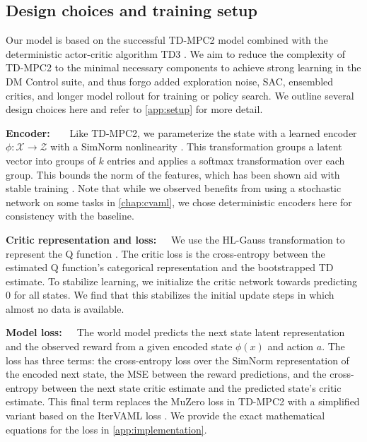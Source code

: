 \subsection{Design choices and training setup}
\label{sec:mad:method}

Our model is based on the successful TD-MPC2 model \parencite{hansen2024tdmpc} combined with the deterministic actor-critic algorithm TD3 \parencite{fujimoto2018addressing}.
We aim to reduce the complexity of TD-MPC2 to the minimal necessary components to achieve strong learning in the DM Control suite, and thus forgo added exploration noise, SAC, ensembled critics, and longer model rollout for training or policy search. We outline several design choices here and refer to \autoref{app:setup} for more detail.

\textbf{Encoder:}~~~~Like TD-MPC2, we parameterize the state with a learned encoder $\phi: \mathcal{X} \rightarrow \mathcal{Z}$ with a SimNorm nonlinearity \parencite{lavoie2023simplicial}. 
This transformation groups a latent vector into groups of $k$ entries and applies a softmax transformation over each group.
This bounds the norm of the features, which has been shown aid with stable training \parencite{hussing2024dissecting,nauman2024overestimation}.
Note that while we observed benefits from using a stochastic network on some tasks in \autoref{chap:cvaml}, we chose deterministic encoders here for consistency with the baseline.

\textbf{Critic representation and loss:}~~~We use the HL-Gauss transformation to represent the Q function \parencite{farebrother2024stop}. The critic loss is the cross-entropy between the estimated Q function's categorical representation and the bootstrapped TD estimate.
To stabilize learning, we initialize the critic network towards predicting $0$ for all states.
We find that this stabilizes the initial update steps in which almost no data is available.

\textbf{Model loss:}~~~The world model predicts the next state latent representation and the observed reward from a given encoded state $\phi(x)$ and action $a$. The loss has three terms: the cross-entropy loss over the SimNorm representation of the encoded next state, the MSE between the reward predictions, and the cross-entropy between the next state critic estimate and the predicted state's critic estimate.
This final term replaces the MuZero loss in TD-MPC2 with a simplified variant based on the IterVAML loss \parencite{itervaml}.
We provide the exact mathematical equations for the loss in \autoref{app:implementation}.


